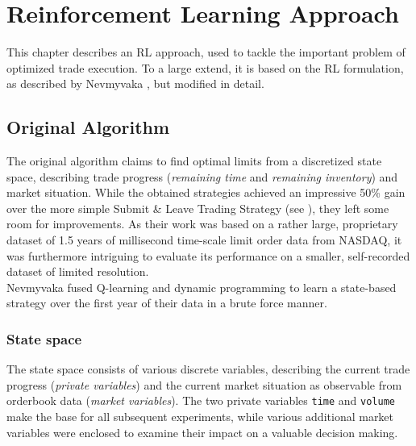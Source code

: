 \chapter{Reinforcement Learning Approach}
\label{chap:reinforcementlearning}
This chapter describes an \ac{RL} approach, used to tackle the important problem of optimized trade execution. To a large extend, it is based on the \ac{RL} formulation, as described by Nevmyvaka \etal \cite{Nevmyvaka:2006}, but modified in detail.\\

\section{Original Algorithm}
\label{chap:reinforcementlearning:original}
The original algorithm claims to find optimal limits from a discretized state space, describing trade progress (\ie \emph{remaining time} and \emph{remaining inventory}) and market situation. While the obtained strategies achieved an impressive 50\% gain over the more simple Submit \& Leave Trading Strategy (see ), they left some room for improvements. As their work was based on a rather large, proprietary dataset of 1.5 years of millisecond time-scale limit order data from NASDAQ, it was furthermore intriguing to evaluate its performance on a smaller, self-recorded dataset of limited resolution.\\

Nevmyvaka \etal \cite{Nevmyvaka:2006} fused Q-learning and dynamic programming to learn a state-based strategy over the first year of their data in a brute force manner.

\subsection{State space}
\label{chap:statespace}
The state space consists of various discrete variables, describing the current trade progress (\emph{private variables}) and the current market situation as observable from orderbook data (\emph{market variables}). The two private variables \lstinline!time! and \lstinline!volume! make the base for all subsequent experiments, while various additional market variables were enclosed to examine their impact on a valuable decision making.\\

